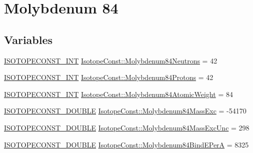 \hypertarget{group___isotope_const-_molybdenum-_mo84}{}\section{Molybdenum 84}
\label{group___isotope_const-_molybdenum-_mo84}
\subsection*{Variables}
\begin{DoxyCompactItemize}
\item 
\mbox{\hyperlink{group___isotope_const-_macros_ga5f18360b3e99483a35c32d789e62621c}{I\+S\+O\+T\+O\+P\+E\+C\+O\+N\+S\+T\+\_\+\+I\+NT}} \mbox{\hyperlink{group___isotope_const-_molybdenum-_mo84_ga82d51a5707485387092fbc1a70210ebc}{Isotope\+Const\+::\+Molybdenum84\+Neutrons}} = 42
\item 
\mbox{\hyperlink{group___isotope_const-_macros_ga5f18360b3e99483a35c32d789e62621c}{I\+S\+O\+T\+O\+P\+E\+C\+O\+N\+S\+T\+\_\+\+I\+NT}} \mbox{\hyperlink{group___isotope_const-_molybdenum-_mo84_ga76958a2e60d0f50038134cd13d74790f}{Isotope\+Const\+::\+Molybdenum84\+Protons}} = 42
\item 
\mbox{\hyperlink{group___isotope_const-_macros_ga5f18360b3e99483a35c32d789e62621c}{I\+S\+O\+T\+O\+P\+E\+C\+O\+N\+S\+T\+\_\+\+I\+NT}} \mbox{\hyperlink{group___isotope_const-_molybdenum-_mo84_gae73cc3beb589bd07ef27c3fbaa2592f1}{Isotope\+Const\+::\+Molybdenum84\+Atomic\+Weight}} = 84
\item 
\mbox{\hyperlink{group___isotope_const-_macros_ga8f45a7272ce02c0b4c65c44636ed719a}{I\+S\+O\+T\+O\+P\+E\+C\+O\+N\+S\+T\+\_\+\+D\+O\+U\+B\+LE}} \mbox{\hyperlink{group___isotope_const-_molybdenum-_mo84_gad0f500cb421d570e34606de73ff3737c}{Isotope\+Const\+::\+Molybdenum84\+Mass\+Exc}} = -\/54170
\item 
\mbox{\hyperlink{group___isotope_const-_macros_ga8f45a7272ce02c0b4c65c44636ed719a}{I\+S\+O\+T\+O\+P\+E\+C\+O\+N\+S\+T\+\_\+\+D\+O\+U\+B\+LE}} \mbox{\hyperlink{group___isotope_const-_molybdenum-_mo84_ga60fff5fe8e8a4856aec30b8b247a1cb1}{Isotope\+Const\+::\+Molybdenum84\+Mass\+Exc\+Unc}} = 298
\item 
\mbox{\hyperlink{group___isotope_const-_macros_ga8f45a7272ce02c0b4c65c44636ed719a}{I\+S\+O\+T\+O\+P\+E\+C\+O\+N\+S\+T\+\_\+\+D\+O\+U\+B\+LE}} \mbox{\hyperlink{group___isotope_const-_molybdenum-_mo84_gaa20fd3235003d9846c2153dfb089c674}{Isotope\+Const\+::\+Molybdenum84\+Bind\+E\+PerA}} = 8325
\item 

\end{DoxyCompactItemize}
